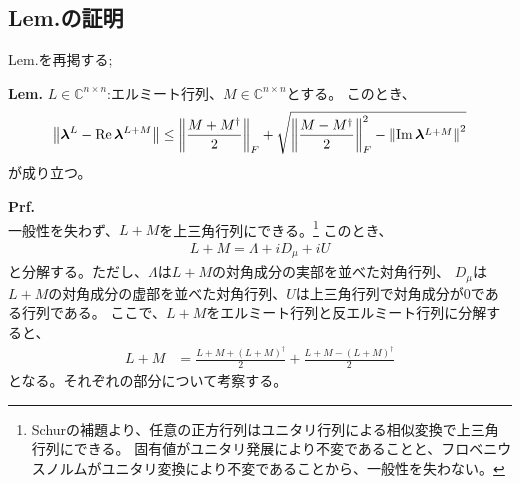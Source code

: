 \documentclass[a4paper,11pt]{jsarticle}
\numberwithin{equation}{section}
\begin{document}
\subsection{Lem.の証明}
Lem.を再掲する;
\begin{itembox}[l]{\textbf{Lem.}}
    $L \in \mathbb{C}^{n \times n}$:エルミート行列、$M \in \mathbb{C}^{n \times n}$とする。
    このとき、
    \begin{align}
        \norm{\bm{\lambda}^L - \Re \bm{\lambda}^{L + M}} \leq 
        \norm{\frac{M + M^{\dagger}}{2}}_F+ \sqrt{\norm{\frac{M - M^{\dagger}}{2}}_F^2 - \norm{\Im \bm{\lambda}^{L + M}}^2}
    \end{align}
    が成り立つ。
\end{itembox}
\textbf{Prf.}\\
一般性を失わず、$L+M$を上三角行列にできる。\footnote{Schurの補題より、任意の正方行列はユニタリ行列による相似変換で上三角行列にできる。
固有値がユニタリ発展により不変であることと、フロベニウスノルムがユニタリ変換により不変であることから、一般性を失わない。}
このとき、
\begin{align}
    L+M = \Lambda + iD_{\mu} +iU
\end{align}
と分解する。ただし、$\Lambda$は$L+M$の対角成分の実部を並べた対角行列、
$D_{\mu}$は$L+M$の対角成分の虚部を並べた対角行列、$U$は上三角行列で対角成分が$0$である行列である。
ここで、$L+M$をエルミート行列と反エルミート行列に分解すると、
\begin{align}
    L+M &= \frac{L+M + (L+M)^{\dagger}}{2} + \frac{L+M - (L+M)^{\dagger}}{2}
\end{align}
となる。それぞれの部分について考察する。\\
\end{document}
